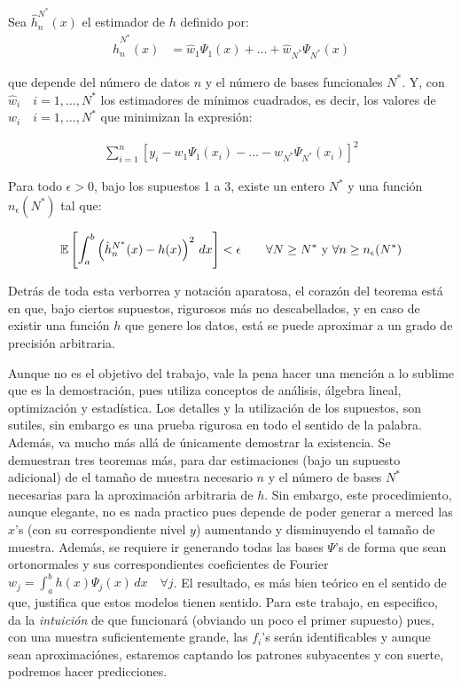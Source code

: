 \documentclass[../../Main/Main.tex]{subfiles}
\begin{document}
\begin{theorem} \label{teo:ConvergenciaBerg}
	Sea $\hat{h}_n^{N^*}(x)$ el estimador de $h$ definido por:
	\begin{align}
		\hat{h}_n^{N^*}(x) &= \hat{w}_1\Psi_1(x) + \ldots + \hat{w}_{N^*}\Psi_{N^*}(x) \label{ec:hGorro}
	\end{align}

que depende del número de datos $n$ y el número de bases funcionales $N^*$. Y, con $\hat{w}_i\quad i = 1,\ldots,N^*$ los estimadores de mínimos cuadrados, es decir, los valores de $w_i\quad i = 1,\ldots,N^*$ que minimizan la expresión:

\begin{align}
	\sum_{i = 1}^n \left[y_i - w_1\Psi_1(x_i) - \ldots - w_{N^*}\Psi_{N^*}(x_i)\right]^2 \label{ec:MinCuadBerg}
\end{align}

Para todo $\epsilon > 0$, bajo los supuestos 1 a 3, existe un entero $N^*$ y una función $n_{\epsilon}(N^*)$ tal que:

\begin{align}
	\mathbb{E}\left[ \int_a^b \left(\hat{h}_n^{N^*}(x) - h(x)\right)^2 \,dx \right] < \epsilon \qquad \forall N \geq N^* \text{ y } \forall n \geq n_{\epsilon}(N^*) \label{ec:TeoremaBerg}
\end{align} 
\end{theorem}

Detrás de toda esta verborrea y notación aparatosa, el corazón del teorema está en que, bajo ciertos supuestos, rigurosos más no descabellados, y en caso de existir una función $h$ que genere los datos, está se puede aproximar a un grado de precisión arbitraria. 

Aunque no es el objetivo del trabajo, vale la pena hacer una mención a lo sublime que es la demostración, pues utiliza conceptos de análisis, álgebra lineal, optimización y estadística. Los detalles y la utilización de los supuestos, son sutiles, sin embargo es una prueba rigurosa en todo el sentido de la palabra. Además,  \autocite{bergstrom1985estimation} va mucho más allá de únicamente demostrar la existencia. Se demuestran tres teoremas más, para dar estimaciones (bajo un supuesto adicional) de el tamaño de muestra necesario $n$ y el número de bases $N^*$ necesarias para la aproximación arbitraria de $h$. Sin embargo, este procedimiento, aunque elegante, no es nada practico pues depende de poder generar a merced las $x$'s (con su correspondiente nivel $y$) aumentando y disminuyendo el tamaño de muestra. Además, se requiere ir generando todas las bases $\Psi$'s de forma que sean ortonormales y sus correspondientes coeficientes de Fourier $w_j = \int_a^bh(x)\Psi_j(x)\,dx \quad \forall j$. El resultado, es más bien teórico en el sentido de que, justifica que estos modelos tienen sentido. Para este trabajo, en especifico, da la \textit{intuición} de que funcionará (obviando un poco el primer supuesto) pues, con una muestra suficientemente grande, las $f_i$'s serán identificables y aunque sean aproximaciónes, estaremos captando los patrones subyacentes y con suerte, podremos hacer predicciones. 
\end{document}
